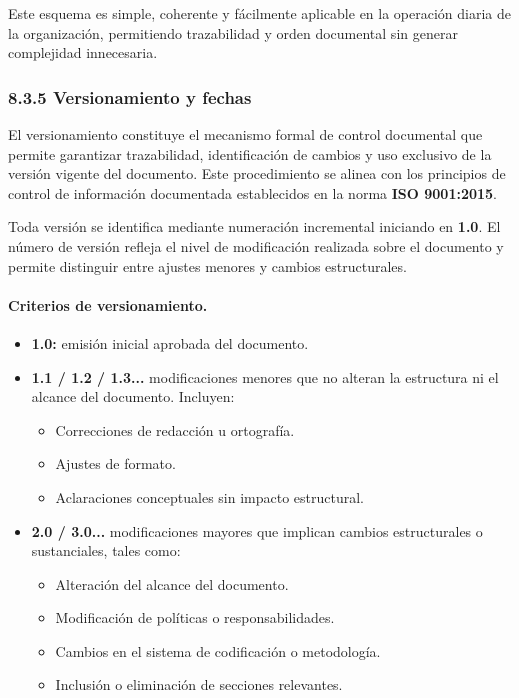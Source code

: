 \documentclass{encabezado}
\begin{document}
Este esquema es simple, coherente y fácilmente aplicable en la operación diaria de la organización, permitiendo trazabilidad y orden documental sin generar complejidad innecesaria.

\subsubsection*{8.3.5 Versionamiento y fechas}

El versionamiento constituye el mecanismo formal de control documental que permite garantizar trazabilidad, identificación de cambios y uso exclusivo de la versión vigente del documento. Este procedimiento se alinea con los principios de control de información documentada establecidos en la norma \textbf{ISO 9001:2015}.

Toda versión se identifica mediante numeración incremental iniciando en \textbf{1.0}. El número de versión refleja el nivel de modificación realizada sobre el documento y permite distinguir entre ajustes menores y cambios estructurales.

\paragraph{Criterios de versionamiento.}

\begin{itemize}
    \item \textbf{1.0:} emisión inicial aprobada del documento.

    \item \textbf{1.1 / 1.2 / 1.3...} modificaciones menores que no alteran la estructura ni el alcance del documento. Incluyen:
          \begin{itemize}
              \item Correcciones de redacción u ortografía.
              \item Ajustes de formato.
              \item Aclaraciones conceptuales sin impacto estructural.
          \end{itemize}

    \item \textbf{2.0 / 3.0...} modificaciones mayores que implican cambios estructurales o sustanciales, tales como:
          \begin{itemize}
              \item Alteración del alcance del documento.
              \item Modificación de políticas o responsabilidades.
              \item Cambios en el sistema de codificación o metodología.
              \item Inclusión o eliminación de secciones relevantes.
          \end{itemize}
\end{itemize}
\end{document}
